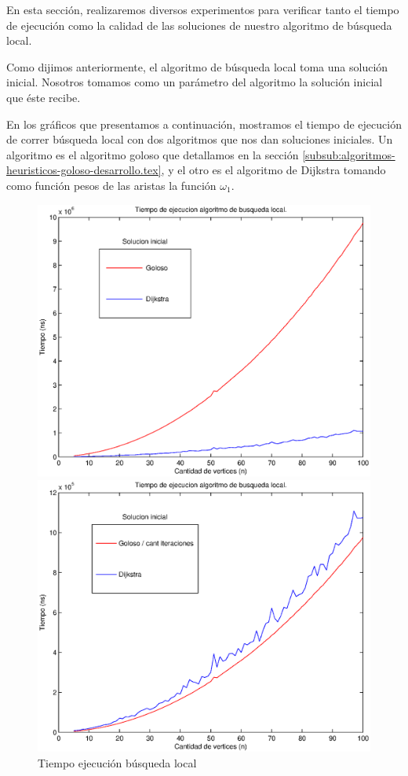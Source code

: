 En esta sección, realizaremos diversos experimentos para verificar tanto el tiempo de ejecución como la calidad de las soluciones de nuestro algoritmo de búsqueda local.

Como dijimos anteriormente, el algoritmo de búsqueda local toma una solución inicial. Nosotros tomamos como un parámetro del algoritmo la solución inicial que éste recibe.

En los gráficos que presentamos a continuación, mostramos el tiempo de ejecución de correr búsqueda local con dos algoritmos que nos dan soluciones iniciales. Un algoritmo es el algoritmo goloso que detallamos en la sección \ref{subsub:algoritmos-heuristicos-goloso-desarrollo.tex}, y el otro es el algoritmo de Dijkstra tomando como función pesos de las aristas la función $\omega_1$.

\begin{figure}[H]
  \begin{minipage}{0.5\linewidth}
    \includegraphics[width=\linewidth]{graficos/busq_local_tiempo.eps}
    \caption{Tiempo ejecución búsqueda local}\label{fig:busq-local-tiempo}
  \end{minipage}
  \hfill
  \begin{minipage}{0.5\linewidth}
    \includegraphics[width=\linewidth]{graficos/busq_local_tiempo_divido10.eps}

\end{minipage}
\end{figure}
